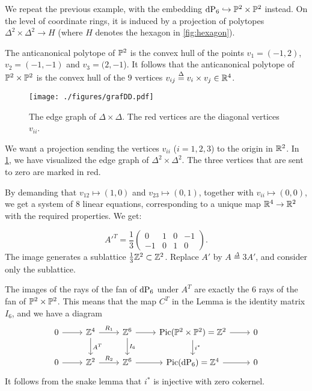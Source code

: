 \begin{example}
\label{example:p2p2}
We repeat the previous example, with the embedding $\dP6 \hookrightarrow \P^2 \times \P^2$ instead. On the level of coordinate rings, it is induced by a projection of polytopes $\Delta^2 \times \Delta^2 \to H$ (where $H$ denotes the hexagon in \cref{fig:hexagon}).

The anticanonical polytope of $\P^2$ is the convex hull of the points $v_1=(-1,2)$, $v_2=(-1,-1)$ and $v_3=(2,-1$). It follows that the anticanonical polytope of $\P^2 \times \P^2$ is the convex hull of the $9$ vertices $v_{ij} \stackrel{\Delta}{=} v_i \times v_j \in \R^4$.

\begin{figure}
  \centering
  \texttt{[image: ./figures/grafDD.pdf]}
  \caption{The edge graph of $\Delta \times \Delta$. The red vertices are the diagonal vertices $v_{ii}$.}
  \label{fig:edgegraphDD}
\end{figure}

We want a projection sending the vertices $v_{ii}$ ($i=1,2,3$) to the origin in $\R^2$. In \cref{fig:edgegraphDD}, we have visualized the edge graph of $\Delta^2 \times \Delta^2$. The three vertices that are sent to zero are marked in red.

By demanding that $v_{12} \mapsto (1,0)$ and $v_{23} \mapsto (0,1)$, together with $v_{ii} \mapsto (0,0)$, we get a system of $8$ linear equations, corresponding to a unique map $\R^4 \to \R^2$ with the required properties. We get:

\[
A'^T =  \frac 13
\begin{pmatrix}
0 & 1 & 0 & -1 \\
-1 & 0 & 1 & 0
\end{pmatrix}.
\]
The image generates a sublattice $\frac 13 \Z^2 \subset \Z^2$. Replace $A'$ by $A \stackrel{\Delta}{=} 3A'$, and consider only the sublattice.

The images of the rays of the fan of $\dP6$ under $A^T$ are exactly the $6$ rays of the fan of $\P^2 \times \P^2$. This means that the map $C^T$ in the Lemma is the identity matrix $I_6$, and we have a diagram
\begin{equation}
\begin{tikzcd}
0 \arrow{r} &  \Z^4 \arrow{r}{R_1} \arrow{d}{A^T} & \Z^6 \arrow{d}{I_6} \arrow{r} & \Pic(\P^2 \times \P^2)=\Z^2  \arrow{d}{i^\ast} \arrow{r} & 0\\
0 \arrow{r} &  \Z^2 \arrow{r}{R_2} & \Z^{6} \arrow{r} & \Pic(\dP6)=\Z^4 \arrow{r} & 0
\end{tikzcd}
\end{equation}
It follows from the snake lemma that $i^\ast$ is injective with zero cokernel.
\end{example}

